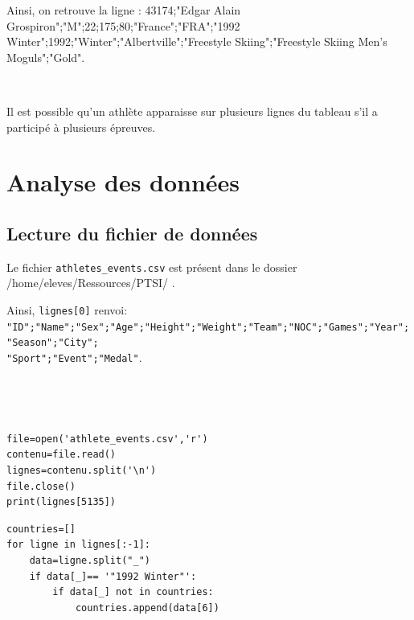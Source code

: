 Ainsi, on retrouve la ligne :
43174;"Edgar Alain Grospiron";"M";22;175;80;"France";"FRA";"1992 Winter";1992;"Winter";"Albertville";"Freestyle Skiing";"Freestyle Skiing Men's Moguls";"Gold".

~\

Il est possible qu'un athlète apparaisse sur plusieurs lignes du tableau s'il a participé à plusieurs épreuves.

\section{Analyse des données}

\subsection{Lecture du fichier de données}

Le fichier \verb?athletes_events.csv? est présent dans le dossier \og /home/eleves/Ressources/PTSI/ \fg. 	


Ainsi, \verb?lignes[0]? renvoi:\\
\verb?"ID";"Name";"Sex";"Age";"Height";"Weight";"Team";"NOC";"Games";"Year";"Season";"City";?
\\
\verb?"Sport";"Event";"Medal"?.

~\

\begin{solution}~\ \\
\begin{verbatim}
file=open('athlete_events.csv','r')
contenu=file.read()
lignes=contenu.split('\n')
file.close()
print(lignes[5135])
\end{verbatim}
\end{solution}


\begin{verbatim}
countries=[]
for ligne in lignes[:-1]:
    data=ligne.split("_")
    if data[_]== '"1992 Winter"':
        if data[_] not in countries:
            countries.append(data[6])
\end{verbatim}

